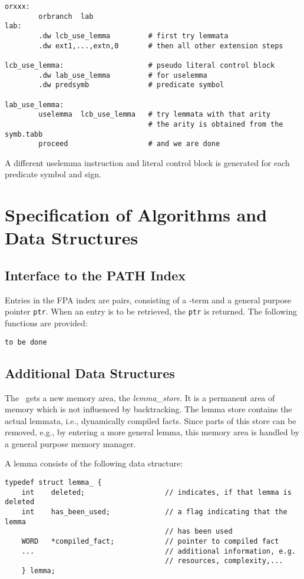 \begin{verbatim}
orxxx:
        orbranch  lab
lab:
        .dw lcb_use_lemma         # first try lemmata
        .dw ext1,...,extn,0       # then all other extension steps

lcb_use_lemma:                    # pseudo literal control block
        .dw lab_use_lemma         # for uselemma
        .dw predsymb              # predicate symbol

lab_use_lemma:
        uselemma  lcb_use_lemma   # try lemmata with that arity
                                  # the arity is obtained from the symb.tabb
        proceed                   # and we are done
\end{verbatim}

A different uselemma instruction and literal control block is generated
for each predicate symbol and sign.


\section{Specification of Algorithms and Data Structures}

\subsection{Interface to the PATH Index}

Entries in the FPA index are pairs, consisting of a \SAM-term and
a general purpose pointer {\tt ptr}. When an entry is to be retrieved,
the {\tt ptr} is returned. 
The following functions are provided:

{\tt to be done}

\subsection{Additional Data Structures}

The \SAM\ gets a new memory area, the {\em lemma\_store}.
It is a permanent area of memory which is not influenced by backtracking.
The lemma store contains the actual lemmata, i.e., dynamically compiled
facts. Since parts of this store can be removed, e.g., by entering a
more general lemma, this memory area is handled by a general purpose
memory manager.

A lemma consists of the following data structure:
\begin{verbatim}
typedef struct lemma_ {
    int    deleted;                   // indicates, if that lemma is deleted
    int    has_been_used;             // a flag indicating that the lemma
                                      // has been used
    WORD   *compiled_fact;            // pointer to compiled fact
    ...                               // additional information, e.g.
                                      // resources, complexity,...
    } lemma;
\end{verbatim}

